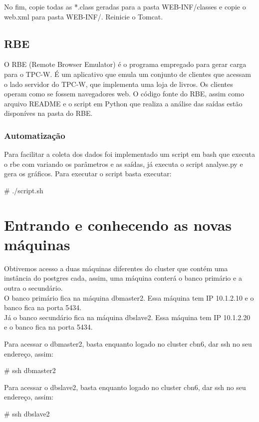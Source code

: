 \documentclass[a4paper,10pt]{article}
\begin{document}
        No fim, copie todas as *.class geradas para a pasta WEB-INF/classes e copie o web.xml para pasta WEB-INF/. Reinicie o Tomcat.

       \subsection{RBE}
        O RBE (Remote Browser Emulator) é o programa empregado para gerar carga para o TPC-W. É um aplicativo que emula um conjunto de clientes que acessam o lado servidor do TPC-W, que implementa uma loja de livros. Os clientes operam como se fossem navegadores web.
        O código fonte do RBE, assim como arquivo README e o script em Python que realiza a análise das saídas estão disponíves na pasta do RBE.

        \subsubsection{Automatização}
        Para facilitar a coleta dos dados foi implementado um script em bash que executa o rbe com variando os parâmetros e as saídas, já executa o script analyse.py e gera os gráficos.
        Para executar o script basta executar:
        \begin{spverbatim}
        # ./script.sh
        \end{spverbatim}

\section{Entrando e conhecendo as novas máquinas}
    Obtivemos acesso a duas máquinas diferentes do cluster que contém uma instância do postgres cada, assim, uma máquina conterá o banco primário e a outra o secundário.\\
    O banco primário fica na máquina dbmaster2. Essa máquina tem IP 10.1.2.10 e o banco fica na porta 5434.\\
    Já o banco secundário fica na máquina dbslave2. Essa máquina tem IP 10.1.2.20 e o banco fica na porta 5434.

    Para acessar o dbmaster2, basta enquanto logado no cluster cbn6, dar ssh no seu endereço, assim:
    \begin{spverbatim}
    # ssh dbmaster2
    \end{spverbatim}

    Para acessar o dbslave2, basta enquanto logado no cluster cbn6, dar ssh no seu endereço, assim:
    \begin{spverbatim}
    # ssh dbslave2
    \end{spverbatim}
\end{document}
